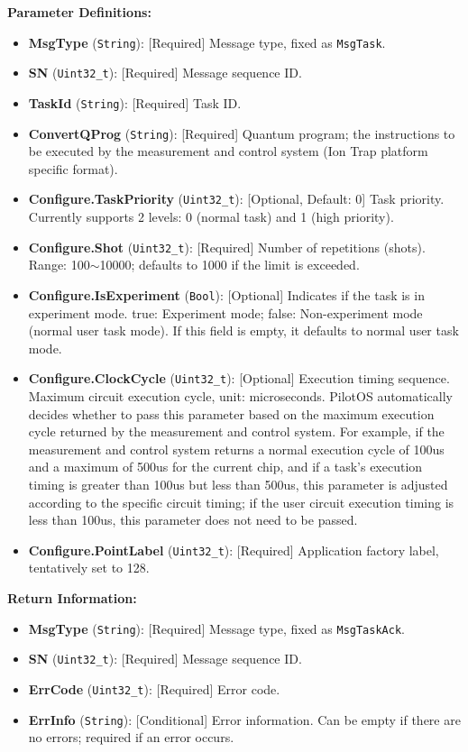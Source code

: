 \documentclass[12pt, a4paper]{article}
\begin{document}
\textbf{Parameter Definitions:}
\begin{itemize}
    \item \textbf{MsgType} (\texttt{String}): [Required] Message type, fixed as \texttt{MsgTask}.
    \item \textbf{SN} (\texttt{Uint32\_t}): [Required] Message sequence ID.
    \item \textbf{TaskId} (\texttt{String}): [Required] Task ID.
    \item \textbf{ConvertQProg} (\texttt{String}): [Required] Quantum program; the instructions to be executed by the measurement and control system (Ion Trap platform specific format).
    \item \textbf{Configure.TaskPriority} (\texttt{Uint32\_t}): [Optional, Default: 0] Task priority. Currently supports 2 levels: 0 (normal task) and 1 (high priority).
    \item \textbf{Configure.Shot} (\texttt{Uint32\_t}): [Required] Number of repetitions (shots). Range: 100$\sim$10000; defaults to 1000 if the limit is exceeded.
    \item \textbf{Configure.IsExperiment} (\texttt{Bool}): [Optional] Indicates if the task is in experiment mode. true: Experiment mode; false: Non-experiment mode (normal user task mode). If this field is empty, it defaults to normal user task mode.
    \item \textbf{Configure.ClockCycle} (\texttt{Uint32\_t}): [Optional] Execution timing sequence. Maximum circuit execution cycle, unit: microseconds. PilotOS automatically decides whether to pass this parameter based on the maximum execution cycle returned by the measurement and control system. For example, if the measurement and control system returns a normal execution cycle of 100us and a maximum of 500us for the current chip, and if a task's execution timing is greater than 100us but less than 500us, this parameter is adjusted according to the specific circuit timing; if the user circuit execution timing is less than 100us, this parameter does not need to be passed.
    \item \textbf{Configure.PointLabel} (\texttt{Uint32\_t}): [Required] Application factory label, tentatively set to 128.
\end{itemize}

\textbf{Return Information:}
\begin{itemize}
    \item \textbf{MsgType} (\texttt{String}): [Required] Message type, fixed as \texttt{MsgTaskAck}.
    \item \textbf{SN} (\texttt{Uint32\_t}): [Required] Message sequence ID.
    \item \textbf{ErrCode} (\texttt{Uint32\_t}): [Required] Error code.
    \item \textbf{ErrInfo} (\texttt{String}): [Conditional] Error information. Can be empty if there are no errors; required if an error occurs.
\end{itemize}
\end{document}
